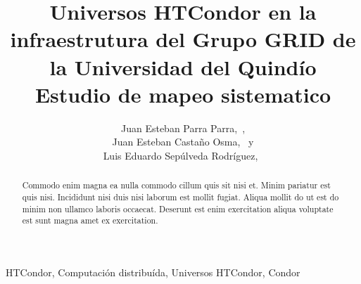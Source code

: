\documentclass[]{IEEEtran}
\begin{document}
\title{
    Universos HTCondor en la infraestrutura del Grupo GRID de la
    Universidad del Quindío \\
    Estudio de mapeo sistematico
}

\author{
    Juan Esteban Parra Parra,~, \\
    Juan Esteban Castaño Osma,~ y \\
    Luis Eduardo Sepúlveda Rodríguez,~
}



\maketitle

\begin{abstract}
Commodo enim magna ea nulla commodo cillum quis sit nisi et. Minim pariatur est quis nisi. Incididunt nisi duis nisi laborum est mollit fugiat. Aliqua mollit do ut est do minim non ullamco laboris occaecat. Deserunt est enim exercitation aliqua voluptate est sunt magna amet ex exercitation.
\end{abstract}


\begin{IEEEkeywords}
HTCondor, Computación distribuída, Universos HTCondor, Condor
\end{IEEEkeywords}


















\end{document}
